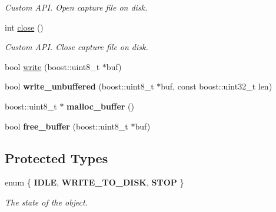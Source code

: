 \begin{DoxyCompactItemize}
\begin{DoxyCompactList}\small\item\em Custom API. Open capture file on disk. \end{DoxyCompactList}\item 
\hypertarget{class_file_writer_a66f2225935e8b52087c18bb55e3de25f}{
int \hyperlink{class_file_writer_a66f2225935e8b52087c18bb55e3de25f}{close} ()}
\label{class_file_writer_a66f2225935e8b52087c18bb55e3de25f}

\begin{DoxyCompactList}\small\item\em Custom API. Close capture file on disk. \end{DoxyCompactList}\item 
bool \hyperlink{class_file_writer_aed0ee15de36255a2883b5f15c710848c}{write} (boost::uint8\_\-t $\ast$buf)
\item 
\hypertarget{class_file_writer_ae0b706212febc337c6569c784caeadef}{
bool {\bfseries write\_\-unbuffered} (boost::uint8\_\-t $\ast$buf, const boost::uint32\_\-t len)}
\label{class_file_writer_ae0b706212febc337c6569c784caeadef}

\item 
\hypertarget{class_file_writer_acfb6a6d1dbfe11e2b95cb71cf8100b5a}{
boost::uint8\_\-t $\ast$ {\bfseries malloc\_\-buffer} ()}
\label{class_file_writer_acfb6a6d1dbfe11e2b95cb71cf8100b5a}

\item 
\hypertarget{class_file_writer_ad299a4d3f66400eb4b0511c1532f524a}{
bool {\bfseries free\_\-buffer} (boost::uint8\_\-t $\ast$buf)}
\label{class_file_writer_ad299a4d3f66400eb4b0511c1532f524a}

\end{DoxyCompactItemize}
\subsection*{Protected Types}
\begin{DoxyCompactItemize}
\item 
enum \{ {\bfseries IDLE}, 
{\bfseries WRITE\_\-TO\_\-DISK}, 
{\bfseries STOP}
 \}
\begin{DoxyCompactList}\small\item\em The state of the object. \end{DoxyCompactList}\end{DoxyCompactItemize}
